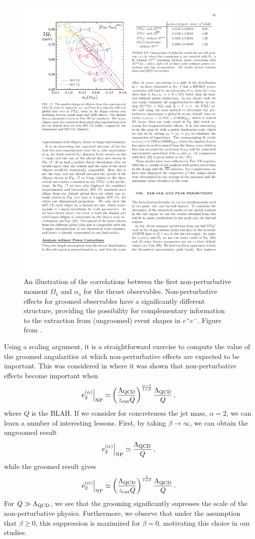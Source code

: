 \begin{figure}
\begin{center}
\includegraphics[width = 0.6\columnwidth]{figures/correlation_firstmoment.pdf}
\end{center}
\caption{An illustration of the correlations between the first non-perturbative moment $\Omega_1$ and $\alpha_s$ for the thrust observables. Non-perturbative effects for groomed observables have a significantly different structure, providing the possibility for complementary information to the extraction from (ungroomed) event shapes in $e^+e^-$. Figure from \cite{Abbate:2010xh}.}
\label{fig:correlation_firstmoment}
\end{figure}


Using a scaling argument, it is a straightforward exercise to compute the value of the groomed angularities at which non-perturbative effects are expected to be important. This was considered in  \cite{Frye:2016aiz}
where it was shown that non-perturbative effects become important when
\begin{align}
\left. e_{2}^{(\alpha)} \right |_{\text{NP}} \simeq  \left( \frac{{\Lambda_\text{QCD}}}{z_{\rm cut} Q}  \right)^{\frac{\alpha-1}{1+\beta}}  \frac{{\Lambda_\text{QCD}}}{Q}\,,
\end{align}
\noindent where $Q$ is the BLAH.  If we consider for concreteness the jet mass, $\alpha=2$, we can learn a number of interesting lessons. First, by taking $\beta\to \infty$, we can obtain the ungroomed result
\begin{align}
\left. e_{2}^{(\alpha)} \right |_{\text{NP}} \simeq  \frac{{\Lambda_\text{QCD}}}{Q}\,,
\end{align} 
while the groomed result gives 
\begin{align}
\left. e_{2}^{(\alpha)} \right |_{\text{NP}} \simeq  \left( \frac{{\Lambda_\text{QCD}}}{z_{\rm cut} Q}  \right)^{\frac{1}{1+\beta}}  \frac{{\Lambda_\text{QCD}}}{Q}\,.
\end{align}
For $Q\gg {\Lambda_\text{QCD}}$, we see that the grooming significantly supresses the scale of the non-perturbative physics. Furthermore, we observe that under the assumption that $\beta \geq 0$, this suppression is maximized for $\beta=0$, motivating this choice in our studies. 

